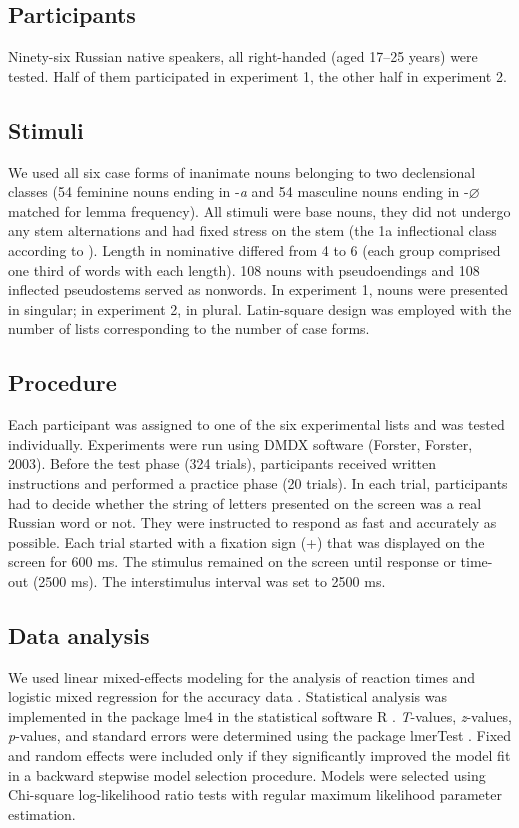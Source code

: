 \documentclass[output=paper, modfonts,newtxmath,hidelinks]{langscibook}
\begin{document}
\subsection{Participants} Ninety-six Russian native speakers, all right-handed (aged 17–25 years) were tested. Half of them participated in experiment 1, the other half in experiment 2.

\subsection{Stimuli} We used all six case forms of inanimate nouns belonging to two declensional classes (54 feminine nouns ending in -\textit{a} and 54 masculine nouns ending in -\textit{$\varnothing$} matched for lemma frequency). All stimuli were base nouns, they did not undergo any stem alternations and had fixed stress on the stem (the 1a inflectional class according to \citealt{zaliznyak1977grammatical}). Length in nominative differed from 4 to 6 (each group comprised one third of words with each length). 108 nouns with pseudoendings and 108 inflected pseudostems served as nonwords. In experiment 1, nouns were presented in singular; in experiment 2, in plural. Latin-square design was employed with the number of lists corresponding to the number of case forms.

\subsection{Procedure} Each participant was assigned to one of the six experimental lists and was tested individually. Experiments were run using DMDX software (Forster, Forster, 2003). Before the test phase (324 trials), participants received written instructions and performed a practice phase (20 trials). In each trial, participants had to decide whether the string of letters presented on the screen was a real Russian word or not. They were instructed to respond as fast and accurately as possible. Each trial started with a fixation sign (+) that was displayed on the screen for 600 ms. The stimulus remained on the screen until response or time-out (2500 ms). The interstimulus interval was set to 2500 ms.

\subsection{Data analysis} We used linear mixed-effects modeling for the analysis of reaction times and logistic mixed regression for the accuracy data  \citep{baayen2008analyzing}. Statistical analysis was implemented in the package lme4  \citep{bates2014lme4} in the statistical software R \citep{team2014r}. \textit{T}-values, \textit{z}-values, \textit{p}-values, and standard errors were determined using the package lmerTest \citep{kuznetsova2015package}. Fixed and random effects were included only if they significantly improved the model fit in a backward stepwise model selection procedure. Models were selected using Chi-square log-likelihood ratio tests with regular maximum likelihood parameter estimation. 
\end{document}
